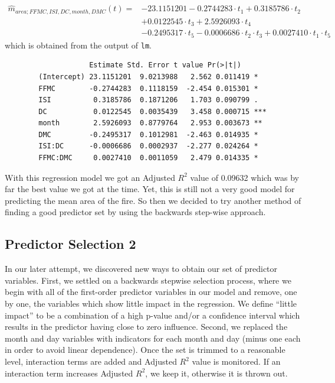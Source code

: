\documentclass{article}
\begin{document}
\begin{align*}
  \widehat{m}_{area;FFMC,ISI,DC,month,DMC}(t) = &-23.1151201 - 0.2744283 \cdot t_1 + 0.3185786 \cdot t_2 \\
  &+ 0.0122545 \cdot t_3 + 2.5926093 \cdot t_4 \\
  &- 0.2495317 \cdot t_5 - 0.0006686 \cdot t_2 \cdot t_3 + 0.0027410 \cdot t_1 \cdot t_5 	   
\end{align*}
which is obtained from the output of \verb=lm=.

\begin{verbatim}
              		Estimate Std. Error t value Pr(>|t|)    
		(Intercept) 23.1151201  9.0213988   2.562 0.011419 *  
		FFMC        -0.2744283  0.1118159  -2.454 0.015301 *  
		ISI          0.3185786  0.1871206   1.703 0.090799 .  
		DC           0.0122545  0.0035439   3.458 0.000715 ***
		month        2.5926093  0.8779764   2.953 0.003673 ** 
		DMC         -0.2495317  0.1012981  -2.463 0.014935 *  
		ISI:DC      -0.0006686  0.0002937  -2.277 0.024264 *  
		FFMC:DMC     0.0027410  0.0011059   2.479 0.014335 *
\end{verbatim}

With this regression model we got an Adjusted $R^{2}$ value of 0.09632 which
was by far the best value we got at the time. Yet, this is still not a very
good model for predicting the mean area of the fire. So then we decided to try
another method of finding a good predictor set by using the backwards step-wise
approach.

\subsection{Predictor Selection 2}

In our later attempt, we discovered new ways to obtain our set of predictor
variables. First, we settled on a backwards stepwise selection process, where
we begin with all of the first-order predictor variables in our model and
remove, one by one, the variables which show little impact in the regression.
We define ``little impact'' to be a combination of a high p-value and/or a
confidence interval which results in the predictor having close to zero
influence. Second, we replaced the month and day variables with indicators for
each month and day (minus one each in order to avoid linear dependence).  Once
the set is trimmed to a reasonable level, interaction terms are added and
Adjusted $R^2$ value is monitored. If an interaction term increases Adjusted
$R^2$, we keep it, otherwise it is thrown out. 
\end{document}
